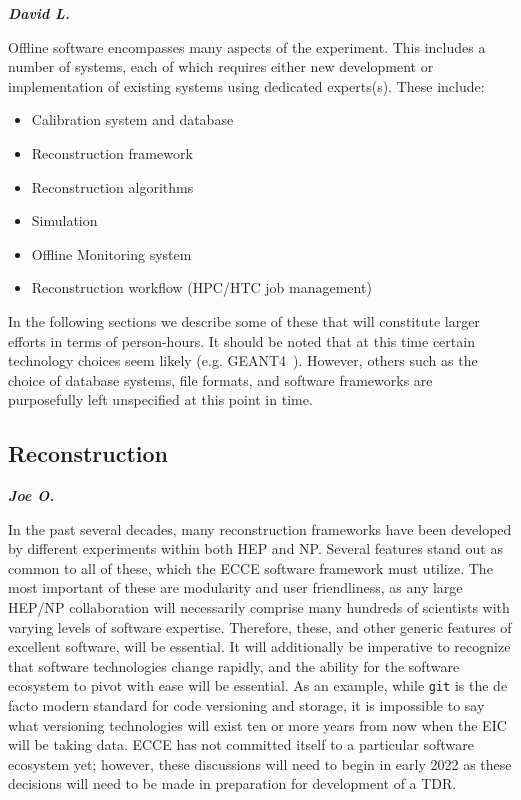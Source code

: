
\textbf{\emph{David L.}}

Offline software encompasses many aspects of the experiment. This includes a number of systems, each of which requires either new development or implementation of existing systems using dedicated experts(s). These include:

\begin{itemize}
    \item Calibration system and database
    \item Reconstruction framework
    \item Reconstruction algorithms
    \item Simulation
    \item Offline Monitoring system
    \item Reconstruction workflow (HPC/HTC job management)
\end{itemize}

In the following sections we describe some of these that will constitute larger efforts in terms of person-hours. It should be noted that at this time certain technology choices seem likely (e.g. GEANT4~\cite{ALLISON2016186}). However, others such as the choice of database systems, file formats, and software frameworks are purposefully left unspecified at this point in time.

\subsection{Reconstruction}

\textbf{\emph{Joe O.}}

In the past several decades, many reconstruction frameworks have been developed by different experiments within both HEP and NP. Several features stand out as common to all of these, which the ECCE software framework must utilize. The most important of these are modularity and user friendliness, as any large HEP/NP collaboration will necessarily comprise many hundreds of scientists with varying levels of software expertise. Therefore, these, and other generic features of excellent software, will be essential. It will additionally be imperative to recognize that software technologies change rapidly, and the ability for the software ecosystem to pivot with ease will be essential. As an example, while \texttt{git} is the de facto modern standard for code versioning and storage, it is impossible to say what versioning technologies will exist ten or more years from now when the EIC will be taking data. ECCE has not committed itself to a particular software ecosystem yet; however, these discussions will need to begin in early 2022 as these decisions will need to be made in preparation for development of a TDR.


